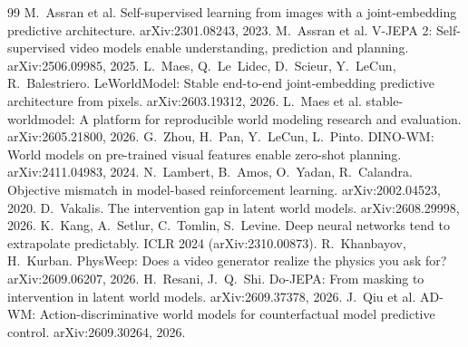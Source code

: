 \documentclass[10pt,twocolumn,a4paper]{article}
\begin{document}
{\footnotesize
\begin{thebibliography}{99}\setlength{\itemsep}{0pt}
 M.~Assran et al. Self-supervised learning from images with a
joint-embedding predictive architecture. arXiv:2301.08243, 2023.
 M.~Assran et al. V-JEPA 2: Self-supervised video models
enable understanding, prediction and planning. arXiv:2506.09985, 2025.
 L.~Maes, Q.~Le~Lidec, D.~Scieur, Y.~LeCun, R.~Balestriero.
LeWorldModel: Stable end-to-end joint-embedding predictive architecture from pixels.
arXiv:2603.19312, 2026.
 L.~Maes et al. stable-worldmodel: A platform for reproducible world
modeling research and evaluation. arXiv:2605.21800, 2026.
 G.~Zhou, H.~Pan, Y.~LeCun, L.~Pinto. DINO-WM: World models on
pre-trained visual features enable zero-shot planning. arXiv:2411.04983, 2024.
 N.~Lambert, B.~Amos, O.~Yadan, R.~Calandra. Objective
mismatch in model-based reinforcement learning. arXiv:2002.04523, 2020.
 D.~Vakalis. The intervention gap in latent world models.
arXiv:2608.29998, 2026.
 K.~Kang, A.~Setlur, C.~Tomlin, S.~Levine. Deep neural
networks tend to extrapolate predictably. ICLR 2024 (arXiv:2310.00873).
 R.~Khanbayov, H.~Kurban. PhysWeep: Does a video generator
realize the physics you ask for? arXiv:2609.06207, 2026.
 H.~Resani, J.~Q.~Shi. Do-JEPA: From masking to intervention in
latent world models. arXiv:2609.37378, 2026.
 J.~Qiu et al. AD-WM: Action-discriminative world models for
counterfactual model predictive control. arXiv:2609.30264, 2026.
\end{thebibliography}}
\end{document}
